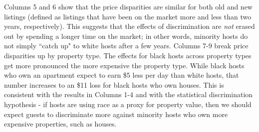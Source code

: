Columns 5 and 6 show that the price disparities are similar for both old and new listings (defined as listings that have been on the market more and less than two years, respectively). This suggests that the effects of discrimination are \textit{not} erased out by spending a longer time on the market; in other words, minority hosts do not simply ``catch up" to white hosts after a few years. Columns 7-9 break price disparities up by property type. The effects for black hosts across property types get more pronounced the more expensive the property type. While black hosts who own an apartment expect to earn \$5 less per day than white hosts, that number increases to an \$11 loss for black hosts who own houses. This is consistent with the results in Columns 1-4 and with the statistical discrimination hypothesis - if hosts are using race as a proxy for property value, then we should expect guests to discriminate more against minority hosts who own more expensive properties, such as houses.   